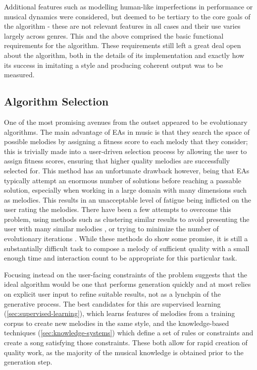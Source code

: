 \documentclass[ author={Stephen Livermore-Tozer},
				supervisor={Dr. Peter Flach},
				degree={MEng},
				title={Algorithmic Co-composition Using Machine Learning},
				subtitle={},
				type={research},
				year={2016} ]{dissertation}
\begin{document}
	Additional features such as modelling human-like imperfections in performance or musical dynamics were considered, but deemed to be tertiary to the core goals of the algorithm - these are not relevant features in all cases and their use varies largely across genres. This and the above comprised the basic functional requirements for the algorithm. These requirements still left a great deal 
	open about the algorithm, both in the details of its implementation and exactly how its success in imitating a style and producing coherent output was to be measured.

	\subsection{Algorithm Selection}
	\label{sec:algorithm-selection}
	
	One of the most promising avenues from the outset appeared to be evolutionary algorithms. The main advantage of EAs in music is that they search the space of possible melodies by assigning a fitness score to each melody that they consider; this is trivially made into a user-driven selection process by allowing the user to assign fitness scores, ensuring that higher quality melodies are successfully selected for. This method has an unfortunate drawback however, being that EAs typically attempt an enormous number of solutions before reaching a passable solution, especially when working in a large domain with many dimensions such as melodies. This results in an unacceptable level of fatigue being inflicted on the user rating the melodies. There have been a few attempts to overcome this problem, using methods such as clustering similar results to avoid presenting the user with many similar melodies \cite{burton1998hybrid,ralley1995genetic}, or trying to minimize the number of evolutionary iterations \cite{marques2010interactive}. While these methods do show some promise, it is still a substantially difficult task to compose a melody of sufficient quality with a small enough time and interaction count to be appropriate for this particular task.

	Focusing instead on the user-facing constraints of the problem suggests that the ideal algorithm would be one that performs generation quickly and at most relies on explicit user input to refine suitable results, not as a lynchpin of the generative process. The best candidates for this are supervised learning (\ref{sec:supervised-learning}), which learns features of melodies from a training corpus to create new melodies in the same style, and the knowledge-based techniques (\ref{sec:knowledge-systems}) which define a set of rules or constraints and create a song satisfying those constraints. These both allow for rapid creation of quality work, as the majority of the musical knowledge is obtained prior to the generation step. 
	
\end{document}
